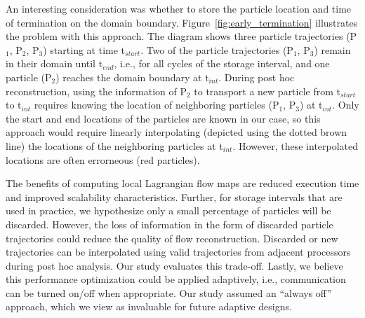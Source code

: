%
An interesting consideration was whether to store the particle location and time of termination on the domain boundary.
%
Figure~\ref{fig:early_termination} illustrates the problem with this approach.
%
The diagram shows three particle trajectories (P$_{1}$, P$_{2}$, P$_{3}$) starting at time t$_{start}$.
%
Two of the particle trajectories (P$_{1}$, P$_{3}$) remain in their domain until t$_{end}$, i.e., for all cycles of the storage interval, and one particle (P$_{2}$) reaches the domain boundary at t$_{int}$.
%
During post hoc reconstruction, using the information of P$_{2}$ to transport a new particle from t$_{start}$ to t$_{int}$ requires knowing the location of neighboring particles (P$_{1}$, P$_{3}$) at t$_{int}$.
%
Only the start and end locations of the particles are known in our case, so this approach would require linearly interpolating (depicted using the dotted brown line) the locations of the neighboring particles at t$_{int}$.
%
However, these interpolated locations are often errorneous (red particles).
%
%

The benefits of computing local Lagrangian flow maps are reduced execution time and improved scalability characteristics. 
%
Further, for storage intervals that are used in practice, we hypothesize only a small percentage of particles will be discarded.
%
However, the loss of information in the form of discarded particle trajectories could reduce the quality of flow reconstruction.
%
Discarded or new trajectories can be interpolated using valid trajectories from adjacent processors during post hoc analysis.
%
Our study evaluates this trade-off.
%
Lastly, we believe this performance optimization could be applied adaptively, i.e., communication can be turned on/off when appropriate.
%
Our study assumed an ``always off'' approach, which we view as invaluable for future adaptive designs.
%
%

